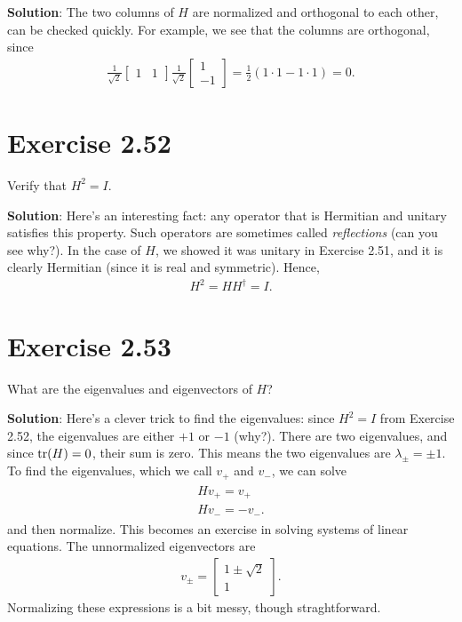 \documentclass{book}
\begin{document}
    \textbf{Solution}: The two columns of $H$ are normalized and orthogonal to each other, can be checked quickly. For example, we see that the columns are orthogonal, since
    \begin{align}
        \frac{1}{\sqrt{2}}\begin{bmatrix}
            1 & 1
        \end{bmatrix} \frac{1}{\sqrt{2}} \begin{bmatrix}
            1 \\
            -1
        \end{bmatrix} = \frac{1}{2}(1\cdot 1 - 1\cdot 1) = 0.
    \end{align}
    
\section*{Exercise 2.52}
    Verify that $H^2 = I$.
    
    \textbf{Solution}: Here's an interesting fact: any operator that is Hermitian and unitary satisfies this property. Such operators are sometimes called \emph{reflections} (can you see why?). In the case of $H$, we showed it was unitary in Exercise 2.51, and it is clearly Hermitian (since it is real and symmetric). Hence,
    \begin{align}
        H^2 = H H^\dagger = I.
    \end{align}
    
\section*{Exercise 2.53}
    What are the eigenvalues and eigenvectors of $H$?
    
    \textbf{Solution}: Here's a clever trick to find the eigenvalues: since $H^2 = I$ from Exercise 2.52, the eigenvalues are either $+1$ or $-1$ (why?). There are two eigenvalues, and since $\tr(H) = 0$, their sum is zero. This means the two eigenvalues are $\lambda_{\pm} = \pm 1$. To find the eigenvalues, which we call $v_+$ and $v_-$, we can solve 
    \begin{align}
    \begin{aligned}
        H v_+ = v_+ \\
        H v_- = -v_-.
    \end{aligned}
    \end{align}
    and then normalize. This becomes an exercise in solving systems of linear equations. The unnormalized eigenvectors are 
    \begin{align}
        v_{\pm} = \begin{bmatrix}
            1 \pm \sqrt{2} \\
            1
        \end{bmatrix}.
    \end{align}
    Normalizing these expressions is a bit messy, though straghtforward.
    
\end{document}

